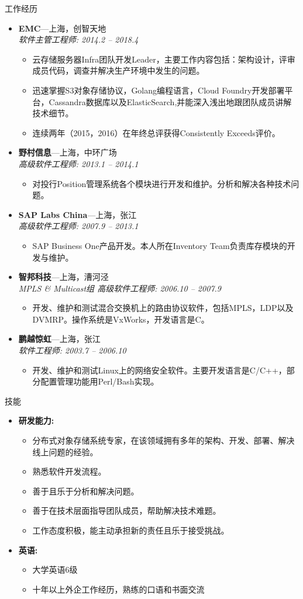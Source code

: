\documentclass[11pt,oneside]{article}
\newenvironment{ressection}[1]{
	\vspace{4pt}
	{\selectfont\Large#1}
	\begin{itemize}
	\vspace{3pt}
}{
	\end{itemize}
}
\newcommand{\resitem}[1]{
	\vspace{-4pt}
	\item \begin{flushleft} #1 \end{flushleft}
}
\newcommand{\ressubitem}[1]{
	\vspace{-1pt}
	\item \begin{flushleft} #1 \end{flushleft}
}
\newcommand{\resbigitem}[3]{
	\vspace{-5pt}
	\item
	\textbf{#1}---#2 \\
	\textit{#3}
}
\newenvironment{ressubsec}[3]{
	\resbigitem{#1}{#2}{#3}
	\vspace{-2pt}
	\begin{itemize}
}{
    \end{itemize}
}
\newenvironment{reslist}[1]{
	\resitem{\textbf{#1}}
	\vspace{-5pt}
	\begin{itemize}
}{
	\end{itemize}
}
\begin{document}
\begin{CJK}{UTF8}{gkai}
\begin{ressection}{工作经历}
	\begin{ressubsec}{EMC}{上海，创智天地}{软件主管工程师: 2014.2 -- 2018.4}
		\ressubitem{云存储服务器Infra团队开发Leader，主要工作内容包括：架构设计，评审成员代码，调查并解决生产环境中发生的问题。}
		\ressubitem{迅速掌握S3对象存储协议，Golang编程语言，Cloud Foundry开发部署平台，Cassandra数据库以及ElasticSearch,并能深入浅出地跟团队成员讲解技术细节。}
		\ressubitem{连续两年（2015，2016）在年终总评获得Consistently Exceeds评价。}
	\end{ressubsec}

	\begin{ressubsec}{野村信息}{上海，中环广场}{高级软件工程师: 2013.1 -- 2014.1}
		\ressubitem{对投行Position管理系统各个模块进行开发和维护。分析和解决各种技术问题。}
	\end{ressubsec}

	\begin{ressubsec}{SAP Labs China}{上海，张江}{高级软件工程师: 2007.9 -- 2013.1}
		\ressubitem{SAP Business One产品开发。本人所在Inventory Team负责库存模块的开发与维护。}
	\end{ressubsec}

	\begin{ressubsec}{智邦科技}{上海，漕河泾}{MPLS \& Multicast组 高级软件工程师: 2006.10 -- 2007.9}
		\ressubitem{开发、维护和测试混合交换机上的路由协议软件，包括MPLS，LDP以及DVMRP。操作系统是VxWorks，开发语言是C。}
	\end{ressubsec}

	\begin{ressubsec}{鹏越惊虹}{上海，张江}{软件工程师: 2003.7 -- 2006.10}
		\ressubitem{开发、维护和测试Linux上的网络安全软件。主要开发语言是C/C++，部分配置管理功能用Perl/Bash实现。}
	\end{ressubsec}

\end{ressection}

\begin{ressection}{技能}

	\begin{reslist}{研发能力:}
		\ressubitem{分布式对象存储系统专家，在该领域拥有多年的架构、开发、部署、解决线上问题的经验。}
		\ressubitem{熟悉软件开发流程。}
		\ressubitem{善于且乐于分析和解决问题。}
		\ressubitem{善于在技术层面指导团队成员，帮助解决技术难题。}
		\ressubitem{工作态度积极，能主动承担新的责任且乐于接受挑战。}
	\end{reslist}

	\begin{reslist}{英语:}
		\ressubitem{大学英语6级}
		\ressubitem{十年以上外企工作经历，熟练的口语和书面交流}
	\end{reslist}


\end{ressection}
\end{CJK}
\end{document}
